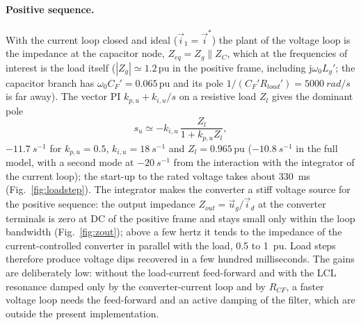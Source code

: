 \documentclass[10pt,a4paper]{scrartcl}
\newcommand{\wo}{\omega_0}
\newcommand{\kpu}{k_{p,u}}
\newcommand{\kiu}{k_{i,u}}
\newcommand{\jj}{\mathrm{j}}
\newcommand{\pu}{\,\mathrm{pu}}
\begin{document}
\begin{onehalfspace}
\paragraph{Positive sequence.} With the current loop closed and ideal ($\vec i_1 = \vec i^*$) the plant of the voltage loop is the impedance at the capacitor node, $Z_{eq} = Z_g \parallel Z_C$, which at the frequencies of interest is the load itself ($|Z_g| \simeq 1.2\pu$ in the positive frame, including $\jj\wo L_g'$; the capacitor branch has $\wo C_F' = 0.065\pu$ and its pole $1/(C_F' R_{load}') = \SI{5000}{rad/s}$ is far away). The vector PI $\kpu + \kiu/s$ on a resistive load $Z_l$ gives the dominant pole
\begin{equation}
s_u \simeq -\kiu\,\frac{Z_l}{1 + \kpu Z_l},
\label{eq:voltage_pole}
\end{equation}
$\SI{-11.7}{s^{-1}}$ for $\kpu = 0.5$, $\kiu = \SI{18}{s^{-1}}$ and $Z_l = 0.965\pu$ ($\SI{-10.8}{s^{-1}}$ in the full model, with a second mode at $\SI{-20}{s^{-1}}$ from the interaction with the integrator of the current loop); the start-up to the rated voltage takes about \SI{330}{ms} (Fig.~\ref{fig:loadstep}). The integrator makes the converter a stiff voltage source for the positive sequence: the output impedance $Z_{out} = \vec u_g/\vec i_d$ at the converter terminals is zero at DC of the positive frame and stays small only within the loop bandwidth (Fig.~\ref{fig:zout}); above a few hertz it tends to the impedance of the current-controlled converter in parallel with the load, 0.5 to \SI{1}{pu}. Load steps therefore produce voltage dips recovered in a few hundred milliseconds. The gains are deliberately low: without the load-current feed-forward and with the LCL resonance damped only by the converter-current loop and by $R_{CF}$, a faster voltage loop needs the feed-forward and an active damping of the filter, which are outside the present implementation.


\end{onehalfspace}
\end{document}
